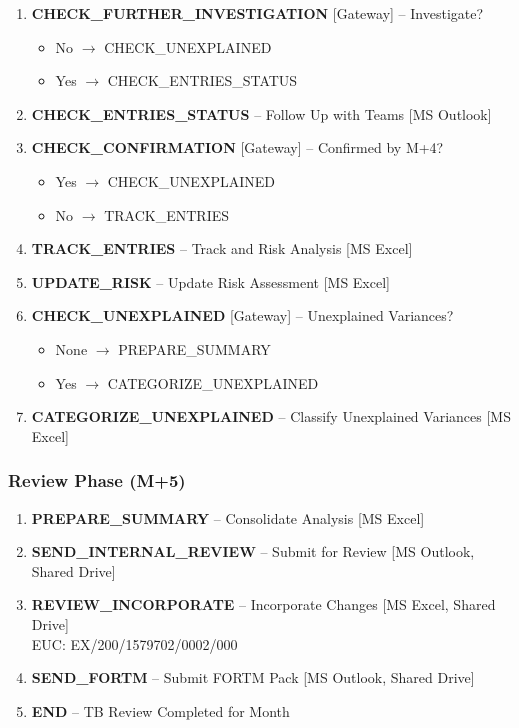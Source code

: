 \documentclass[11pt,a4paper]{article}
\begin{document}
\begin{enumerate}[nosep,start=8]
    \item \textbf{CHECK\_FURTHER\_INVESTIGATION} {\small [Gateway]} -- Investigate?
        \begin{itemize}[nosep]
            \item No $\rightarrow$ CHECK\_UNEXPLAINED
            \item Yes $\rightarrow$ CHECK\_ENTRIES\_STATUS
        \end{itemize}
    \item \textbf{CHECK\_ENTRIES\_STATUS} -- Follow Up with Teams {\small [MS Outlook]}
    \item \textbf{CHECK\_CONFIRMATION} {\small [Gateway]} -- Confirmed by M+4?
        \begin{itemize}[nosep]
            \item Yes $\rightarrow$ CHECK\_UNEXPLAINED
            \item No $\rightarrow$ TRACK\_ENTRIES
        \end{itemize}
    \item \textbf{TRACK\_ENTRIES} -- Track and Risk Analysis {\small [MS Excel]}
    \item \textbf{UPDATE\_RISK} -- Update Risk Assessment {\small [MS Excel]}
    \item \textbf{CHECK\_UNEXPLAINED} {\small [Gateway]} -- Unexplained Variances?
        \begin{itemize}[nosep]
            \item None $\rightarrow$ PREPARE\_SUMMARY
            \item Yes $\rightarrow$ CATEGORIZE\_UNEXPLAINED
        \end{itemize}
    \item \textbf{CATEGORIZE\_UNEXPLAINED} -- Classify Unexplained Variances {\small [MS Excel]}
\end{enumerate}

\subsubsection{Review Phase (M+5)}

\begin{enumerate}[nosep,start=23]
    \item \textbf{PREPARE\_SUMMARY} -- Consolidate Analysis {\small [MS Excel]}
    \item \textbf{SEND\_INTERNAL\_REVIEW} -- Submit for Review {\small [MS Outlook, Shared Drive]}
    \item \textbf{REVIEW\_INCORPORATE} -- Incorporate Changes {\small [MS Excel, Shared Drive]} \\
          {\footnotesize EUC: EX/200/1579702/0002/000}
    \item \textbf{SEND\_FORTM} -- Submit FORTM Pack {\small [MS Outlook, Shared Drive]}
    \item \textbf{END} -- TB Review Completed for Month
\end{enumerate}
\end{document}
